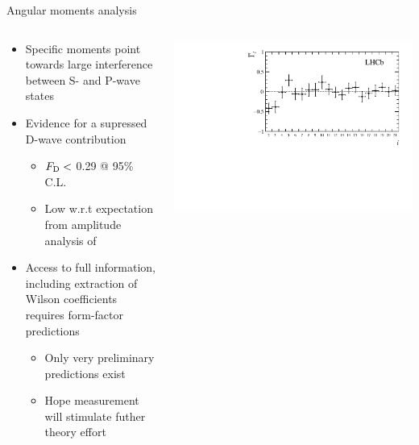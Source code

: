 \documentclass[aspectratio=1610]{beamer}
\begin{document}
\begin{frame}{Angular moments analysis}
\begin{columns}
\begin{column}{0.55\textwidth}
\begin{itemize}
  \item Specific moments point towards large interference between S- and P-wave states 
  \item Evidence for a supressed D-wave contribution
  \begin{itemize}
    \item $F_{\rm D} <$ 0.29 @ 95\% C.L.
    \item Low w.r.t expectation from amplitude analysis of \BdToJPsiKpi%
  \end{itemize}
\end{itemize}
\begin{itemize}
  \item Access to full information, including extraction of Wilson coefficients requires form-factor predictions
  \begin{itemize}
    \item[\ding{70}] Only very preliminary predictions exist 
    \item[\ding{72}] Hope measurement will stimulate futher theory effort
  \end{itemize}
\end{itemize}
\end{column}
\begin{column}{0.45\textwidth}
\centering
\includegraphics[height=0.44\textheight]{figs/kpimm/angular-analysis/mom_results_2_21.pdf}\\

\end{column}
\end{columns}
\end{frame}
\end{document}
